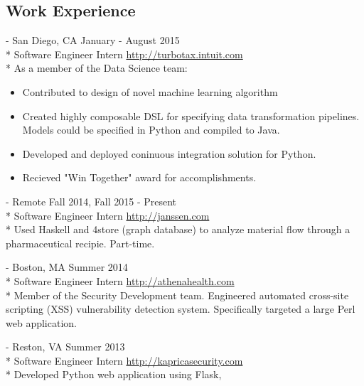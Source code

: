\documentclass[letter,margin,line]{resume}
\newcommand{\rurl}[1]{\hfill {\footnotesize \url{#1}}}
\newcommand{\rdate}[1]{\hfill {\small #1}}
\renewcommand{\employer}[6]{\item[#1] - #2 \rdate{#3} \\* #4 \rurl{#5}\\* #6}
\begin{document}
\begin{resume}
        \section{\mysidestyle Work Experience}
        \begin{asparadesc}
            \employer{Intuit}
                     {San Diego, CA}
                     {January - August 2015}
                     {Software Engineer Intern}
                     {http://turbotax.intuit.com}
                     {
                         As a member of the Data Science team:
                         \begin{itemize}[]
                             \item Contributed to design of novel machine learning algorithm
                             \item Created highly composable DSL for specifying data
                                   transformation pipelines. Models could be specified in Python and
                                   compiled to Java.
                             \item Developed and deployed coninuous integration solution for Python.
                             \item Recieved "Win Together" award for accomplishments.
                         \end{itemize}
                     }
            \employer{Janssen Pharmaceutical}
                     {Remote}
                     {Fall 2014, Fall 2015 - Present}
                     {Software Engineer Intern}
                     {http://janssen.com}
                     {Used Haskell and 4store (graph database) to analyze material 
                      flow through a pharmaceutical recipie. Part-time.}\\
            \employer{athenahealth}
                     {Boston, MA}
                     {Summer 2014}
                     {Software Engineer Intern}
                     {http://athenahealth.com}
                     {Member of the Security Development team.
                      Engineered automated cross-site scripting
                      (XSS) vulnerability detection system.
                      Specifically targeted a large Perl web application. 
                     }\\
            \employer{Kaprica Security}
                     {Reston, VA}
                     {Summer 2013}
                     {Software Engineer Intern}
                     {http://kapricasecurity.com}
                     {Developed Python web application using Flask,
}
\end{asparadesc}
\end{resume}
\end{document}
